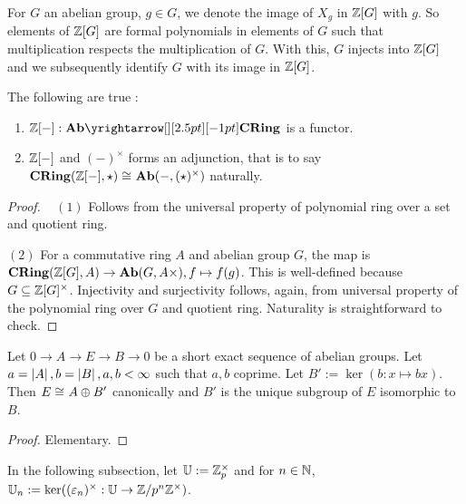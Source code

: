\begin{notation}
  For $G$ an abelian group, $g \in G$, 
  we denote the image of $X_g$ in $\mathbb{Z}[G]$ with $g$. 
  So elements of $\mathbb{Z}[G]$ are formal polynomials in elements of $G$
  such that multiplication respects the multiplication of $G$. 
  With this, $G$ injects into $\mathbb{Z}[G]$ and we subsequently identify $G$
  with its image in $\mathbb{Z}[G]$. 
\end{notation}

\begin{prop}
  
  The following are true : 
  \begin{enumerate}
    \item $\Z[-] : \map{\AB}{\CRING}{}{}$ is a functor. 
    \item $\mathbb{Z}[-]$ and $(-)^\times$ forms an adjunction, that is to say 
    $\mathbf{CRing}(\mathbb{Z}[-],\star) \cong_{} \mathbf{Ab}(-,(\star)^\times)$ naturally. 
  \end{enumerate}
\end{prop}
\begin{proof}~
  $(1)$ Follows from the universal property of polynomial ring over a set
  and quotient ring. 

  $(2)$ For a commutative ring $A$ and abelian group $G$, 
  the map is $\mathbf{CRing}(\mathbb{Z}[G],A) \to \mathbf{Ab}(G,A\times), f \mapsto f(g)$. 
  This is well-defined because $G \subseteq \mathbb{Z}[G]^\times$. 
  Injectivity and surjectivity follows, again, from 
  universal property of the polynomial ring over $G$ and quotient ring.
  Naturality is straightforward to check. 
\end{proof}

\begin{prop}
  
  Let $0 \to A \to E \to B \to 0$ be a short exact sequence of abelian groups.
  Let $a = \left\vert A \right\vert, b = \left\vert B \right\vert, a, b < \infty$ such that $a,b$ coprime. 
  Let $B' := \ker(b : x \mapsto b x)$. 
  Then $E \cong_{} A \oplus B'$ canonically and 
  $B'$ is the unique subgroup of $E$ isomorphic to $B$. 
\end{prop}
\begin{proof}
  Elementary. 
\end{proof}

In the following subsection, 
let $\mathbb{U} := \mathbb{Z}_p^\times$ and for $n \in \mathbb{N}$, 
$\mathbb{U}_n := \ker((\varepsilon_n)^\times : \mathbb{U} \to \mathbb{Z}/p^n\mathbb{Z}^\times)$. 

